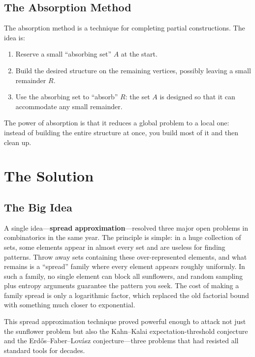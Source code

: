 \subsection{The Absorption Method}

The absorption method is a technique for completing partial constructions. The idea is:

\begin{enumerate}
\item Reserve a small ``absorbing set'' $A$ at the start.
\item Build the desired structure on the remaining vertices, possibly leaving a small remainder $R$.
\item Use the absorbing set to ``absorb'' $R$: the set $A$ is designed so that it can accommodate any small remainder.
\end{enumerate}

The power of absorption is that it reduces a global problem to a local one: instead of building the entire structure at once, you build most of it and then clean up.

\section{The Solution}

\subsection{The Big Idea}

A single idea---\textbf{spread approximation}---resolved three major open problems in combinatorics in the same year. The principle is simple: in a huge collection of sets, some elements appear in almost every set and are useless for finding patterns. Throw away sets containing these over-represented elements, and what remains is a ``spread'' family where every element appears roughly uniformly. In such a family, no single element can block all sunflowers, and random sampling plus entropy arguments guarantee the pattern you seek. The cost of making a family spread is only a logarithmic factor, which replaced the old factorial bound with something much closer to exponential.

This spread approximation technique proved powerful enough to attack not just the sunflower problem but also the Kahn--Kalai expectation-threshold conjecture and the Erd\H{o}s--Faber--Lov\'{a}sz conjecture---three problems that had resisted all standard tools for decades.

